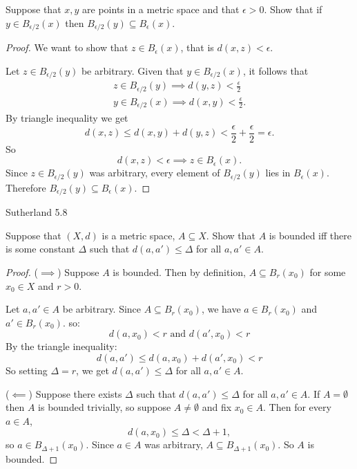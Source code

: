 \documentclass[minion]{homework}
\begin{document}
\begin{problems}
Suppose that $x, y$ are points in a metric space and that $\epsilon > 0$.
Show that if $y \in B_{\epsilon/2}(x)$ then $B_{\epsilon/2}(y) \subseteq B_\epsilon(x)$. \newline

\begin{proof}
We want to show that $z \in B_\epsilon(x)$, that is $d(x,z) < \epsilon$.

  Let $z \in B_{\epsilon/2}(y)$ be arbitrary. Given that $y \in B_{\epsilon/2}(x)$, it follows that
    \begin{align*}
      z \in B_{\epsilon/2}(y) \implies d(y,z) < \frac{\epsilon}{2} \\
      y \in B_{\epsilon/2}(x) \implies d(x,y) < \frac{\epsilon}{2}.
    \end{align*}
    By triangle inequality we get
    $$d(x,z) \leq d(x,y) + d(y,z) < \frac{\epsilon}{2} + \frac{\epsilon}{2} = \epsilon.$$
    So
    $$d(x,z) < \epsilon \implies z \in B_\epsilon(x).$$
    Since $z \in B_{\epsilon/2}(y)$ was arbitrary, every element of $B_{\epsilon/2}(y)$ lies in $B_\epsilon(x)$. Therefore $B_{\epsilon/2}(y) \subseteq B_\epsilon(x)$.
\end{proof}

\problem Sutherland 5.8

Suppose that $(X,d)$ is a metric space, $A \subseteq X$. Show that $A$ is
bounded iff there is some constant $\Delta$ such that $d(a,a') \le \Delta$
for all $a, a' \in A$. \newline
\begin{proof}
  ($\implies$) Suppose $A$ is bounded. Then by definition, $A \subseteq B_r(x_0)$ for some $x_0 \in X$ and $r > 0$.

  Let $a, a' \in A$ be arbitrary. Since $A \subseteq B_r(x_0)$, we have $a \in B_r(x_0)$ and $a' \in B_r(x_0)$.
  so:
  $$d(a,x_0) < r \text{ and } d(a',x_0) < r$$
  By the triangle inequality:
  $$ d(a,a') \leq d(a,x_0) + d(a', x_0) < r $$
  So setting $\Delta = r$, we get $d(a, a') \leq \Delta$ for all $a, a' \in A$.

  ($\impliedby$) Suppose there exists $\Delta$ such that $d(a, a') \leq \Delta$ for all $a, a' \in A$. If $A = \emptyset$ then $A$ is bounded trivially, so suppose $A \ne \emptyset$ and fix $x_0 \in A$. Then for every $a \in A$,
  $$d(a, x_0) \leq \Delta < \Delta + 1,$$
  so $a \in B_{\Delta+1}(x_0)$. Since $a \in A$ was arbitrary, $A \subseteq B_{\Delta+1}(x_0)$. So $A$ is bounded.
\end{proof}


\end{problems}
\end{document}
